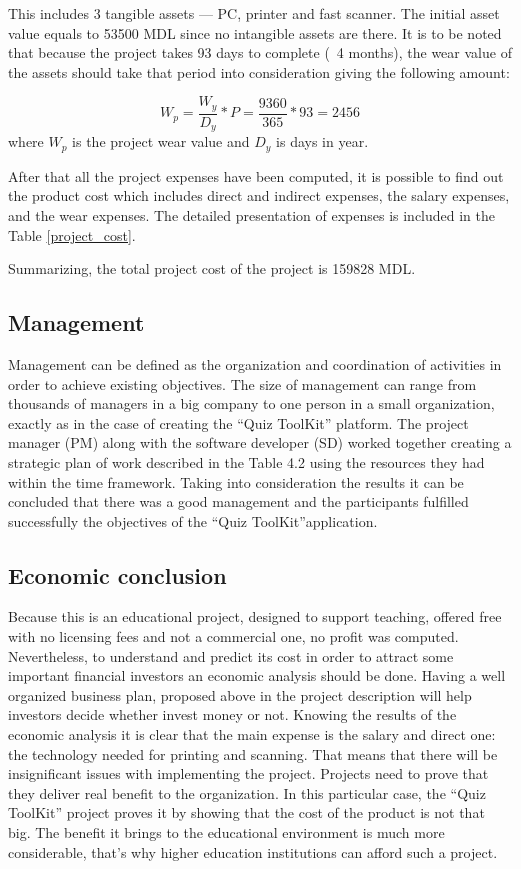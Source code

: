 This includes 3 tangible assets — PC, printer and fast scanner. The initial asset value equals to 53500 MDL since no intangible assets are there. It is to be noted that because the project takes 93 days to complete (~4 months), the wear value of the assets should take that period into consideration giving the following amount:

\begin{equation}
  W_{p} = \frac{W_{y}}{D_{y}} * P = \frac{9360}{365} * 93 = 2456 \label{4.7}
\end{equation}
where $W_{p}$ is the project wear value and $D_{y}$ is days in year.

After that all the project expenses have been computed, it is possible to find out the product cost which includes direct and indirect expenses, the salary expenses, and the wear expenses. The detailed presentation of expenses is included in the Table \ref{project_cost}. 

Summarizing, the total project cost of the project is 159828 MDL. 

\subsection{Management}
Management can be defined as the organization and coordination of activities in order to achieve existing objectives. The size of management can range from thousands of managers in a big company to one person in a small organization, exactly as in the case of creating the “Quiz ToolKit” platform. The project manager (PM) along with the software developer (SD) worked together creating a strategic plan of work described in the Table 4.2 using the resources they had within the time framework. Taking into consideration the results it can be concluded that there was a good management and the participants fulfilled successfully the objectives of the “Quiz ToolKit”application. 

\subsection{Economic conclusion}
Because this is an educational project, designed to support teaching, offered free with no licensing fees and not a commercial one, no profit was computed. Nevertheless, to understand and predict its cost in order to attract some important financial investors an economic analysis should be done. Having a well organized business plan, proposed above in the project description will help investors decide whether invest money or not.  Knowing the results of the economic analysis it is clear that the main expense is the salary and direct one: the technology needed for printing and scanning. That means that there will be insignificant issues with implementing the project.
Projects need to prove that they deliver real benefit to the organization. In this particular case, the “Quiz ToolKit” project proves it by showing that the cost of the product is not that big. The benefit it brings to the educational environment is much more considerable, that’s why higher education institutions can afford such a project.   
